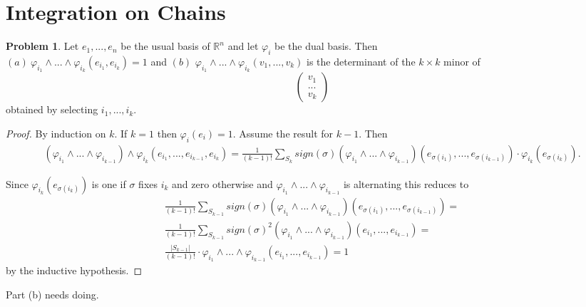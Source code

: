\documentclass[20pt]{article}
\theoremstyle{plain}
\theoremstyle{definition}
\newtheorem*{problem}{Problem}
\begin{document}
\break
\section{Integration on Chains}



\begin{problem}{4.1}
  Let $e_1, ..., e_n$ be the usual basis of $\mathbb{R}^n$ and let $\varphi_i$ be the dual basis.
  Then \\
  $(a) \ \varphi_{i_1} \wedge ... \wedge \varphi_{i_k} (e_{i_1}, e_{i_k}) = 1$ and
  $(b)$ $\varphi_{i_1} \wedge ... \wedge \varphi_{i_k}(v_1, ..., v_k)$ is the determinant of 
  the $k \times k$ minor of 
  $$\begin{pmatrix}v_1 \\ ...\\ v_k\end{pmatrix}$$
  obtained by selecting $i_1, ..., i_k$.
\end{problem}

\begin{proof}
  By induction on $k$.
  If $k = 1$ then $\varphi_i(e_i) = 1.$
  Assume the result for $k-1$. Then
  \begin{align*}
    (\varphi_{i_{1}} \wedge ... \wedge \varphi_{i_{k-1}}) \wedge \varphi_{i_{k}}
    (e_{i_1}, ..., e_{i_{k-1}}, e_{i_{k}})=
    \frac{1}{(k-1)!} \sum_{S_k}sign(\sigma)(\varphi_{i_{1}} \wedge ... \wedge \varphi_{i_{k-1}})(e_{\sigma(i_1)}, ..., e_{\sigma(i_{k-1})}) \cdot
     \varphi_{i_{k}}(e_{\sigma(i_k)}).
  \end{align*}

  Since $\varphi_{i_{k}}(e_{\sigma(i_k)})$ is one if $\sigma$ fixes $i_k$ and zero otherwise and
  $\varphi_{i_{1}} \wedge ... \wedge \varphi_{i_{k-1}}$ is alternating this reduces to 
  \begin{align*}
    \frac{1}{(k-1)!} \sum_{S_{k-1}}sign(\sigma)(\varphi_{i_{1}} \wedge ... \wedge \varphi_{i_{k-1}})(e_{\sigma(i_1)}, ..., e_{\sigma(i_{k-1})}) = \\
    \frac{1}{(k-1)!} \sum_{S_{k-1}}sign(\sigma)^2(\varphi_{i_{1}} \wedge ... \wedge \varphi_{i_{k-1}})(e_{i_1}, ..., e_{i_{k-1}}) = \\
    \frac{|S_{k-1}|}{(k-1)!} \cdot  \varphi_{i_{1}} \wedge ... \wedge \varphi_{i_{k-1}} (e_{i_1}, ..., e_{i_{k-1}}) = 1
  \end{align*}
  by the inductive hypothesis.
\end{proof}
\color{Blue}
Part (b) needs doing.
\color{Black}
\end{document}
